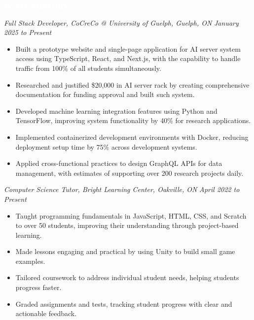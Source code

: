 \documentclass[9pt]{src/developercv}
\begin{document}
  \vspace{\baselineskip}
  \colorbox{sky900}{\textcolor{white}{\LARGE\MakeUppercase{\textbf{Work History}}}}
  
  \vspace{1.0\baselineskip}

  \textit{Full Stack Developer, CoCreCo @ University of Guelph, Guelph, ON} \hfill \textit{January 2025 to Present}
  \begin{itemize}[leftmargin=2em, rightmargin=2.5em, itemsep=0.1em]
    \item Built a prototype website and single-page application for AI server system access using TypeScript, React, and Next.js, with the capability to handle traffic from 100\% of all students simultaneously.
    \item Researched and justified \$20,000 in AI server rack by creating comprehensive documentation for funding approval and built such system.
    \item Developed machine learning integration features using Python and TensorFlow, improving system functionality by 40\% for research applications.
    \item Implemented containerized development environments with Docker, reducing deployment setup time by 75\% across development systems.
    \item Applied cross-functional practices to design GraphQL APIs for data management, with estimates of supporting over 200 research projects daily.
  \end{itemize}

  \vspace{1.0\baselineskip}

  \textit{Computer Science Tutor, Bright Learning Center, Oakville, ON} \hfill \textit{April 2022 to Present}
  \begin{itemize}[leftmargin=2em, rightmargin=2.5em, itemsep=0.1em]
    \item Taught programming fundamentals in JavaScript, HTML, CSS, and Scratch to over 50 students, improving their understanding through project-based learning.
    \item Made lessons engaging and practical by using Unity to build small game examples.
    \item Tailored coursework to address individual student needs, helping students progress faster.
    \item Graded assignments and tests, tracking student progress with clear and actionable feedback.
  \end{itemize}
\end{document}
